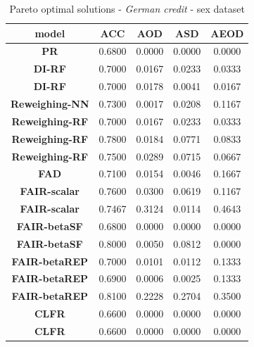 \documentclass[preprint,12pt]{elsarticle}
\begin{document}
\begin{table}
	\centering
	\caption{Pareto optimal solutions - \textit{German credit} - sex dataset}
	\begin{tabular}{|c|c|c|c|c|}
		\hline
		\textbf{model}           & \textbf{ACC} & \textbf{AOD} & \textbf{ASD} & \textbf{AEOD} \\ \hline
		\textbf{PR}              & 0.6800       & 0.0000       & 0.0000       & 0.0000        \\ \hline
		\textbf{DI-RF}           & 0.7000       & 0.0167       & 0.0233       & 0.0333        \\ \hline
		\textbf{DI-RF}           & 0.7000       & 0.0178       & 0.0041       & 0.0167        \\ \hline
		\textbf{Reweighing-NN}   & 0.7300       & 0.0017       & 0.0208       & 0.1167        \\ \hline
		\textbf{Reweighing-RF}   & 0.7000       & 0.0167       & 0.0233       & 0.0333        \\ \hline
		\textbf{Reweighing-RF}   & 0.7800       & 0.0184       & 0.0771       & 0.0833        \\ \hline
		\textbf{Reweighing-RF}   & 0.7500       & 0.0289       & 0.0715       & 0.0667        \\ \hline
		\textbf{FAD}             & 0.7100       & 0.0154       & 0.0046       & 0.1667        \\ \hline
		\textbf{FAIR-scalar}     & 0.7600       & 0.0300       & 0.0619       & 0.1167        \\ \hline
		\textbf{FAIR-scalar}     & 0.7467       & 0.3124       & 0.0114       & 0.4643        \\ \hline
		\textbf{FAIR-betaSF}     & 0.6800       & 0.0000       & 0.0000       & 0.0000        \\ \hline
		\textbf{FAIR-betaSF}     & 0.8000       & 0.0050       & 0.0812       & 0.0000        \\ \hline
		\textbf{FAIR-betaREP}    & 0.7000       & 0.0101       & 0.0112       & 0.1333        \\ \hline
		\textbf{FAIR-betaREP}    & 0.6900       & 0.0006       & 0.0025       & 0.1333        \\ \hline
		\textbf{FAIR-betaREP}    & 0.8100       & 0.2228       & 0.2704       & 0.3500        \\ \hline
		\textbf{CLFR}            & 0.6600       & 0.0000       & 0.0000       & 0.0000        \\ \hline
		\textbf{CLFR}            & 0.6600       & 0.0000       & 0.0000       & 0.0000        \\ \hline

\end{tabular}
\end{table}
\end{document}
